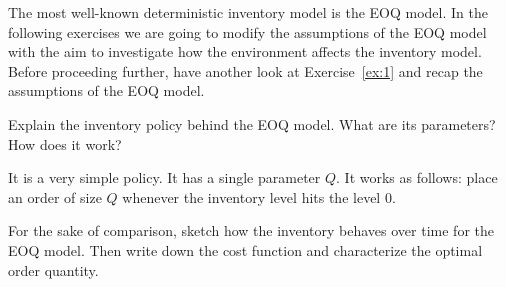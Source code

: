 The most well-known deterministic inventory model is the EOQ model. In the following exercises we are going to modify the assumptions of the EOQ model with the aim to investigate how the environment affects the inventory model. Before proceeding further, have another look at Exercise~\ref{ex:1} and recap the assumptions of the EOQ model.

\begin{question}
Explain the inventory policy behind the EOQ model. What are its parameters? How does it work?
\end{question}

  \begin{solution}
It is a very simple policy. It has a single parameter $Q$. It works as follows: place an order of size $Q$ whenever the inventory level hits the level 0.
  \end{solution}
  
\begin{question}
For the sake of comparison, sketch how the inventory behaves over time for the EOQ model. Then write down the cost function and characterize the optimal order quantity.
\end{question}

